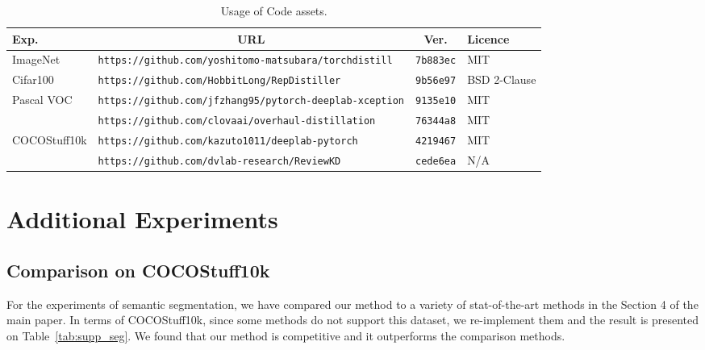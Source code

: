 \documentclass[10pt,letterpaper]{article}
\begin{document}
\begin{table*}[h]
    \centering
    \caption{Usage of Code assets.}
    \begin{tabular}{l|l|c|l}
        \toprule
         Exp.&\multicolumn{1}{c|}{URL} &Ver. &Licence \\\midrule
         ImageNet&{\tt \small https://github.com/yoshitomo-matsubara/torchdistill} &{\tt \small 7b883ec} &MIT\\ \midrule
         Cifar100&{\tt \small https://github.com/HobbitLong/RepDistiller}&{\tt \small 9b56e97} &BSD 2-Clause \\ \midrule
         \multirow{2}{*}{Pascal VOC}&{\tt \small https://github.com/jfzhang95/pytorch-deeplab-xception}&{\tt \small 9135e10} & MIT\\
         &{\tt \small https://github.com/clovaai/overhaul-distillation} &{\tt \small 76344a8} &MIT\\ \midrule
         \multirow{2}{*}{COCOStuff10k} &{\tt \small https://github.com/kazuto1011/deeplab-pytorch} &{\tt \small 4219467} &MIT\\
         &{\tt \small https://github.com/dvlab-research/ReviewKD} &{\tt \small cede6ea} &N/A\\
        \bottomrule
    \end{tabular}
    \label{tab:my_label}
\end{table*}





\section{Additional Experiments}
\subsection{Comparison on COCOStuff10k}
For the experiments of semantic segmentation, we have compared our method to a variety of stat-of-the-art methods in the Section 4 of the main paper. In terms of COCOStuff10k, since some methods do not support this dataset, we re-implement them and the result is presented on Table~\ref{tab:supp_seg}. We found that our method is competitive and it outperforms the comparison methods.
\end{document}
